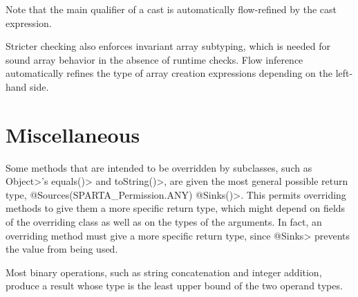 Note that the main qualifier of a cast is automatically flow-refined
by the cast expression.


\medskip

Stricter checking also enforces invariant array subtyping, which is
needed for sound array behavior in the absence of runtime checks.
Flow inference automatically refines the type of array creation
expressions depending on the left-hand side.

\section{Miscellaneous\label{sec:miscellaneous}}

Some methods that are intended to be overridden by subclasses, such as 
\<Object>'s \<equals()> and \<toString()>, are given the most general
possible return type, \<@Sources(SPARTA_Permission.ANY) @Sinks({})>.
This permits overriding methods to give them a more specific return type, which
might depend on fields of the overriding class as well as on the types of
the arguments.  In fact, an overriding method must give a more specific
return type, since \<@Sinks> prevents the value from being used.

Most binary operations, such as string concatenation and integer addition,
produce a result whose type is the least upper bound of the two operand types.





